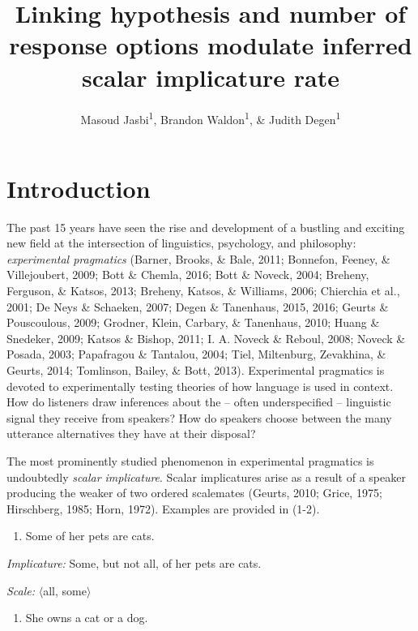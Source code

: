 \documentclass[man]{apa6}
\title{Linking hypothesis and number of response options modulate inferred
scalar implicature rate}
\author{Masoud Jasbi\textsuperscript{1}, Brandon Waldon\textsuperscript{1}, \& Judith Degen\textsuperscript{1}}
\affiliation{
    \vspace{0.5cm}
          \textsuperscript{1} Stanford University, Department of Linguistics  }
\providecommand{\tightlist}{%
  \setlength{\itemsep}{0pt}\setlength{\parskip}{0pt}}
\theoremstyle{definition}
\theoremstyle{definition}
\theoremstyle{definition}
\theoremstyle{remark}
\begin{document}
\maketitle

\setcounter{secnumdepth}{0}



\section{Introduction}\label{introduction}

The past 15 years have seen the rise and development of a bustling and
exciting new field at the intersection of linguistics, psychology, and
philosophy: \emph{experimental pragmatics} (Barner, Brooks, \& Bale,
2011; Bonnefon, Feeney, \& Villejoubert, 2009; Bott \& Chemla, 2016;
Bott \& Noveck, 2004; Breheny, Ferguson, \& Katsos, 2013; Breheny,
Katsos, \& Williams, 2006; Chierchia et al., 2001; De Neys \& Schaeken,
2007; Degen \& Tanenhaus, 2015, 2016; Geurts \& Pouscoulous, 2009;
Grodner, Klein, Carbary, \& Tanenhaus, 2010; Huang \& Snedeker, 2009;
Katsos \& Bishop, 2011; I. A. Noveck \& Reboul, 2008; Noveck \& Posada,
2003; Papafragou \& Tantalou, 2004; Tiel, Miltenburg, Zevakhina, \&
Geurts, 2014; Tomlinson, Bailey, \& Bott, 2013). Experimental pragmatics
is devoted to experimentally testing theories of how language is used in
context. How do listeners draw inferences about the -- often
underspecified -- linguistic signal they receive from speakers? How do
speakers choose between the many utterance alternatives they have at
their disposal?

The most prominently studied phenomenon in experimental pragmatics is
undoubtedly \emph{scalar implicature}. Scalar implicatures arise as a
result of a speaker producing the weaker of two ordered scalemates
(Geurts, 2010; Grice, 1975; Hirschberg, 1985; Horn, 1972). Examples are
provided in (1-2).

\begin{enumerate}
\def\labelenumi{(\arabic{enumi})}
\tightlist
\item
  Some of her pets are cats.
\end{enumerate}

\emph{Implicature:} Some, but not all, of her pets are cats.

\emph{Scale:} $\langle$all, some$\rangle$

\begin{enumerate}
\def\labelenumi{(\arabic{enumi})}
\setcounter{enumi}{1}
\tightlist
\item
  She owns a cat or a dog.
\end{enumerate}
\end{document}
